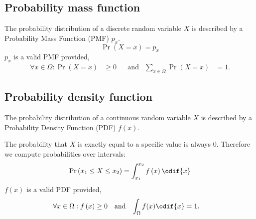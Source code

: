 \documentclass{article}
\begin{document}
\begin{multicols}{3}
    \subsection{Probability mass function}
    The probability distribution of a discrete random variable \(X\) is described by a Probability
    Mass Function (PMF) \(p_x\).
    \begin{equation*}
        \Pr{\left( X = x \right)} = p_x
    \end{equation*}
    \(p_x\) is a valid PMF provided,
    \begin{align*}
        \forall x \in \Omega : \Pr{\left( X = x \right)} & \geq 0 &  & \text{and} & \sum_{x \in \Omega} \Pr{\left( X = x \right)} & = 1.
    \end{align*}
    \subsection{Probability density function}
    The probability distribution of a continuous random variable \(X\) is described by a Probability
    Density Function (PDF) \(f\left( x \right)\).

    The probability that \(X\) is exactly equal to a
    specific value is always 0. Therefore we compute probabilities over intervals:
    \begin{equation*}
        \Pr{\left( x_1 \leq X \leq x_2 \right)} = \int_{x_1}^{x_2} f\left( x \right) \odif{x}
    \end{equation*}
    \(f\left( x \right)\) is a valid PDF provided,
    \begin{align*}
        \forall x \in \Omega : f\left( x \right) & \geq 0 &  & \text{and} & \int_{\Omega} f(x) \odif{x} & = 1.
    \end{align*}

\end{multicols}
\end{document}
